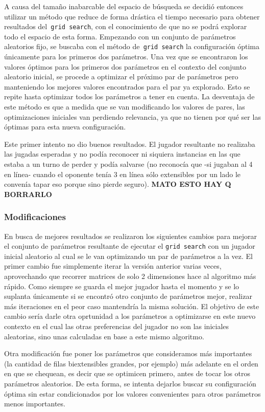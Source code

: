 \documentclass[A4paper,oneside,fleqn,11pt]{article}
\theoremstyle{definition}
\begin{document}
A causa del tamaño inabarcable del espacio de búsqueda se decidió entonces utilizar un método que reduce de forma drástica el tiempo necesario para obtener resultados del\texttt{ grid search}, con el conocimiento de que no se podrá explorar todo el espacio de esta forma. Empezando con un conjunto de parámetros aleatorios fijo, se buscaba con el método de\texttt{ grid search} la configuración óptima únicamente para los primeros dos parámetros. Una vez que se encontraron los valores óptimos para los primeros dos parámetros en el contexto del conjunto aleatorio inicial, se procede a optimizar el próximo par de parámetros pero manteniendo los mejores valores encontrados para el par ya explorado. Esto se repite hasta optimizar todos los parámetros a tener en cuenta. La desventaja de este método es que a medida que se van modificando los valores de pares, las optimizaciones iniciales van perdiendo relevancia, ya que no tienen por qué ser las óptimas para esta nueva configuración.

Este primer intento no dio buenos resultados. El jugador resultante no realizaba las jugadas esperadas y no podía reconocer ni siquiera instancias en las que estaba a un turno de perder y podía salvarse (no reconocía que -si jugaban al 4 en línea- cuando el oponente tenía 3 en línea sólo extensibles por un lado le convenía tapar eso porque sino pierde seguro).
\textbf{MATO ESTO HAY Q BORRARLO}


\subsubsection{Modificaciones}

En busca de mejores resultados se realizaron los siguientes cambios para mejorar el conjunto de parámetros resultante de ejecutar el \texttt{grid search} con un jugador inicial aleatorio al cual se le van optimizando un par de parámetros a la vez. El primer cambio fue simplemente iterar la versión anterior varias veces, aprovechando que recorrer matrices de solo 2 dimensiones hace al algoritmo más rápido. Como siempre se guarda el mejor jugador hasta el momento y se lo suplanta únicamente si se encontró otro conjunto de parámetros mejor, realizar más iteraciones en el peor caso mantendría la misma solución. El objetivo de este cambio sería darle otra oprtunidad a los parámetros a optimizarse en este nuevo contexto en el cual las otras preferencias del jugador no son las iniciales aleatorias, sino unas calculadas en base a este mismo algoritmo. 

Otra modificación fue poner los parámetros que consideramos más importantes (la cantidad de filas biextensibles grandes, por ejemplo) más adelante en el orden en que se chequean, es decir que se optimicen primero, antes de tocar los otros parámetros aleatorios. De esta forma, se intenta dejarlos buscar su configuración óptima sin estar condicionados por los valores convenientes para otros parámetros menos importantes. 
\end{document}
